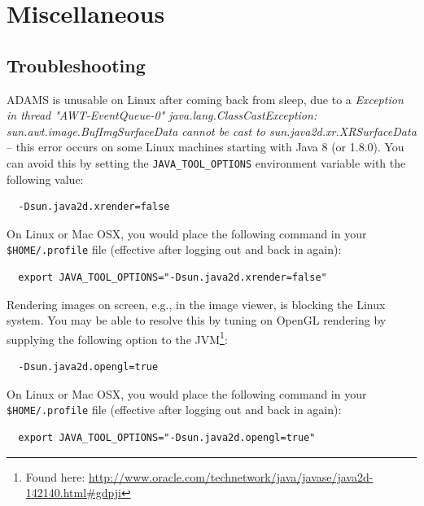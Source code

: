 \chapter{Miscellaneous}

\section{Troubleshooting}
\begin{tight_itemize}
  \item ADAMS is unusable on Linux after coming back from sleep, due to a
  \textit{Exception in thread "AWT-EventQueue-0" java.lang.ClassCastException:
  sun.awt.image.BufImgSurfaceData cannot be cast to sun.java2d.xr.XRSurfaceData}
  -- this error occurs on some Linux machines starting with Java 8 (or 1.8.0).
  You can avoid this by setting the \texttt{JAVA\_TOOL\_OPTIONS} environment variable with the following value:
  \begin{verbatim}
  -Dsun.java2d.xrender=false
  \end{verbatim}
  On Linux or Mac OSX, you would place the following command in your
  \texttt{\$HOME/.profile} file (effective after logging out and back in again):
  \begin{verbatim}
  export JAVA_TOOL_OPTIONS="-Dsun.java2d.xrender=false"
  \end{verbatim}

  \item Rendering images on screen, e.g., in the image viewer, is blocking the
  Linux system. You may be able to resolve this by tuning on OpenGL rendering
  by supplying the following option to the JVM\footnote{Found here: \url{http://www.oracle.com/technetwork/java/javase/java2d-142140.html\#gdpji}{}}:
  \begin{verbatim}
  -Dsun.java2d.opengl=true
  \end{verbatim}
  On Linux or Mac OSX, you would place the following command in your
  \texttt{\$HOME/.profile} file (effective after logging out and back in again):
  \begin{verbatim}
  export JAVA_TOOL_OPTIONS="-Dsun.java2d.opengl=true"
  \end{verbatim}
\end{tight_itemize}
